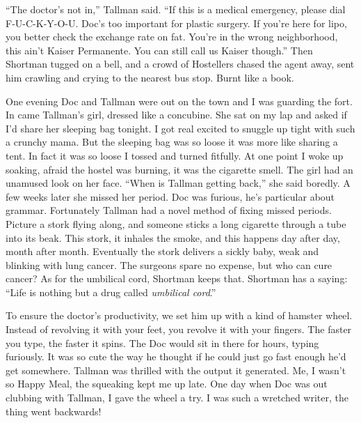 \documentclass[oneside]{book}
\begin{document}
``The doctor's not in,'' Tallman said.  ``If this is a medical emergency, please dial F-U-C-K-Y-O-U.
Doc's too important for plastic surgery.  If you're here for lipo, you better
check the exchange rate on fat.  You're in the wrong neighborhood, this ain't
Kaiser Permanente.  You can still call us Kaiser though.''  Then Shortman tugged on a bell, and
a crowd of Hostellers chased the agent away, sent him crawling and crying to the nearest
bus stop.  Burnt like a book.

One evening Doc and Tallman were out on the town and I was guarding the fort.
In came Tallman's girl, dressed like a concubine.  She sat on my lap and asked if
I'd share her sleeping bag tonight.  I got real excited to
snuggle up tight with such a crunchy mama.  But the sleeping bag was so loose it was
more like sharing a tent.  In fact it was so loose I tossed and turned fitfully.  At one
point I woke up soaking, afraid the hostel was burning, it was the cigarette smell.
The girl had an unamused look on her face.  ``When is Tallman getting back,'' she said boredly.
A few weeks later she missed her period.  Doc was furious, he's
particular about grammar.  Fortunately Tallman had a novel method of fixing missed
periods.  Picture a stork flying along, and someone sticks a long cigarette through a tube
into its beak.  This stork, it inhales the smoke, and this happens day after day, month
after month.  Eventually the stork delivers a sickly baby, weak and blinking with lung
cancer.  The surgeons spare no expense, but who can cure cancer?  As for the
umbilical cord, Shortman keeps that.
Shortman has a saying:  ``Life is nothing but a drug called \emph{umbilical cord}.''

To ensure the doctor's productivity, we set him up with a kind of hamster
wheel.  Instead of revolving it with your feet, you revolve it with your fingers.
The faster you type, the faster it spins.  The Doc would sit in there for hours,
typing furiously.  It was so cute the way he thought if he could just go
fast enough he'd get somewhere.  Tallman was thrilled with the output it
generated.  Me, I wasn't so Happy Meal, the squeaking kept me up late.
One day when Doc was out clubbing with Tallman, I gave the wheel
a try.  I was such a wretched writer, the thing went backwards!
\end{document}
